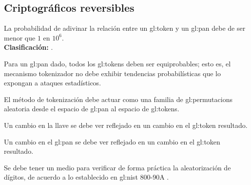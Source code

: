%
%

\subsection{Criptográficos reversibles}

{
  La probabilidad de adivinar la relación entre un \gls{gl:token} y un
  \gls{gl:pan} debe de ser menor que $ 1 $ en $ 10^6 $. \\
  \nopagebreak[4]
  \textbf{Clasificación:} .

  {
    Para un \gls{gl:pan} dado, todos los \glspl{gl:token} deben ser
    equiprobables; esto es, el mecanismo tokenizador no debe exhibir
    tendencias probabilísticas que lo expongan a ataques estadísticos.
  }

  {
    El método de tokenización debe actuar como una familia de
    \glspl{gl:permutacion} aleatoria desde el espacio de \gls{gl:pan} al
    espacio de \glspl{gl:token}.
  }

  {
    Un cambio en la llave se debe ver reflejado en un cambio en el
    \gls{gl:token} resultado.
  }

  {
    Un cambio en el \gls{gl:pan} se debe ver reflejado en un cambio en el
    \gls{gl:token} resultado.
  }

  {
    Se debe tener un medio para verificar de forma práctica la aleatorización
    de dígitos, de acuerdo a lo establecido en \gls{gl:nist} 800-90A
    \cite{nist_aleatorios}.
  }

}

